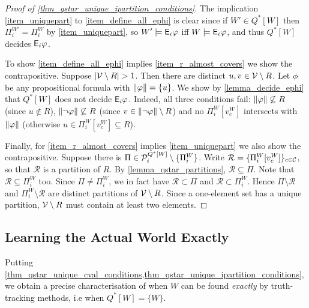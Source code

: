 \begin{proof}[Proof of \cref{thm_qstar_unique_ipartition_conditions}]

    The implication \cref{item_uniquepart} to \cref{item_define_all_ephi} is
    clear since if $W' \in Q^*[W]$ then $\Pi^{W'}_i = \Pi^W_i$ by
    \cref{item_uniquepart}, so $W' \models \mathsf{E}_i\varphi$ iff $W \models \mathsf{E}_i\varphi$,
    and thus $Q^*[W]$ decides $\mathsf{E}_i\varphi$.

    To show \cref{item_define_all_ephi} implies \cref{item_r_almost_covers} we
    show the contrapositive. Suppose $|\mathcal{V} \setminus R| > 1$. Then there are
    distinct $u, v \in \mathcal{V} \setminus R$. Let $\phi$ be any propositional
    formula with $\|{\varphi}\| = \{u\}$. We show by \cref{lemma_decide_ephi}
    that $Q^*[W]$ does not decide $\mathsf{E}_i\varphi$. Indeed, all three conditions
    fail: $\|{\varphi}\| \not\subseteq R$ (since $u \notin R$),
    $\|{\neg\varphi}\| \not\subseteq R$ (since $v \in \|{\neg\varphi}\|
    \setminus R$) and no $\Pi^W_i[v^W_c]$ intersects with $\|{\varphi}\|$
    (otherwise $u \in \Pi^W_i[v^W_c] \subseteq R$).

    Finally, for \cref{item_r_almost_covers} implies \cref{item_uniquepart} we
    also show the contrapositive. Suppose there is $\Pi \in \mathcal{P}^{Q^*[W]}_i
    \setminus \{\Pi^W_i\}$. Write $\mathcal{R} = \{\Pi^W_i[v^W_c]\}_{c \in
    \mathcal{C}}$, so that $\mathcal{R}$ is a partition of $R$. By
    \cref{lemma_qstar_partitions}, $\mathcal{R} \subseteq \Pi$. Note that
    $\mathcal{R} \subseteq \Pi^W_i$ too. Since $\Pi \ne \Pi^W_i$, we in fact
    have $\mathcal{R} \subset \Pi$ and $\mathcal{R} \subset \Pi^W_i$. Hence
    $\Pi \setminus \mathcal{R}$ and $\Pi^W_i \setminus \mathcal{R}$ are
    distinct partitions of $\mathcal{V} \setminus R$. Since a one-element set has a
    unique partition, $\mathcal{V} \setminus R$ must contain at least two elements.
\end{proof}

\subsection{Learning the Actual World Exactly}

Putting
\cref{thm_qstar_unique_cval_conditions,thm_qstar_unique_ipartition_conditions},
we obtain a precise characterisation of when $W$ can be found \emph{exactly} by
truth-tracking methods, i.e when $Q^*[W] = \{W\}$.

